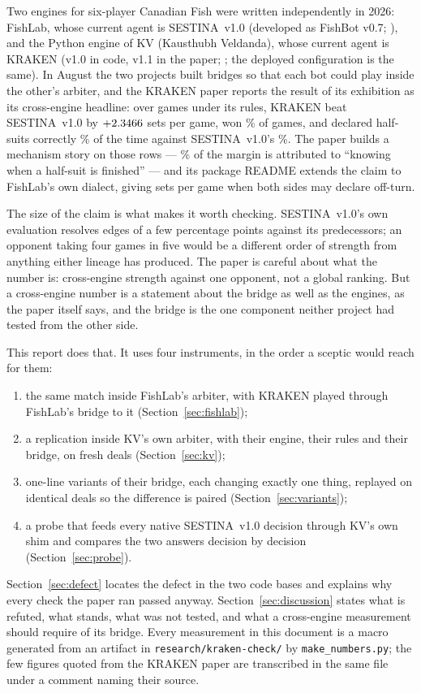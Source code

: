 \documentclass[11pt]{article}
\newcommand{\code}[1]{\texttt{#1}}
\newcommand{\sestina}{\mbox{SESTINA v1.0}}
\newcommand{\pct}{\%}
\begin{document}
Two engines for six-player Canadian Fish were written independently in 2026: FishLab, whose
current agent is \sestina{} (developed as FishBot v0.7; \cite{sestina}), and the Python engine of
KV (Kausthubh Veldanda), whose current agent is KRAKEN (v1.0 in code, v1.1 in the paper;
\cite{kraken}; the deployed configuration is the same). In August the two projects
built bridges so that each bot could play inside the other's arbiter, and the KRAKEN paper reports the
result of its exhibition as its cross-engine headline: over \kcMegaN{} games under its rules, KRAKEN
beat \sestina{} by $+2.3466$ sets per game, won \kcMegaWin\pct{} of games, and declared
half-suits correctly \kcMegaDeclKV\pct{} of the time against \sestina{}'s \kcMegaDeclS\pct{}. The paper
builds a mechanism story on those rows --- \kcPaperDeclShare\pct{} of the margin is attributed to
``knowing when a half-suit is finished'' --- and its package README extends the claim to FishLab's own
dialect, giving \kcReadmeBoth{} sets per game when both sides may declare off-turn.

The size of the claim is what makes it worth checking. \sestina{}'s own evaluation resolves edges of a
few percentage points against its predecessors; an opponent taking four games in five would be a
different order of strength from anything either lineage has produced. The paper is careful about what
the number is: cross-engine strength against one opponent, not a global ranking. But a cross-engine
number is a statement about the bridge as well as the engines, as the paper itself says, and the bridge
is the one component neither project had tested from the other side.

This report does that. It uses four instruments, in the order a sceptic would reach for them:
\begin{enumerate}
\item the same match inside FishLab's arbiter, with KRAKEN played through FishLab's bridge to it
      (Section~\ref{sec:fishlab});
\item a replication inside KV's own arbiter, with their engine, their rules and their bridge, on fresh
      deals (Section~\ref{sec:kv});
\item one-line variants of their bridge, each changing exactly one thing, replayed on identical deals so
      the difference is paired (Section~\ref{sec:variants});
\item a probe that feeds every native \sestina{} decision through KV's own shim and compares the two
      answers decision by decision (Section~\ref{sec:probe}).
\end{enumerate}
Section~\ref{sec:defect} locates the defect in the two code bases and explains why every check the
paper ran passed anyway. Section~\ref{sec:discussion} states what is refuted, what stands, what was
not tested, and what a cross-engine measurement should require of its bridge. Every measurement in this
document is a macro generated from an artifact in \code{research/kraken-check/} by
\code{make\_numbers.py}; the few figures quoted from the KRAKEN paper are transcribed in the same
file under a comment naming their source.
\end{document}

